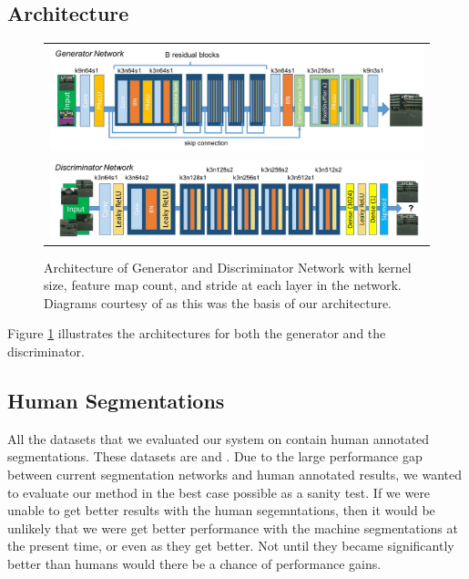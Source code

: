 \documentclass[10pt,twocolumn,letterpaper]{article}
\begin{document}
\subsection{Architecture}
\begin{figure}[ht!]
\begin{center}
    \begin{tabular}{c}
	\includegraphics[width=6.5in]{images/generator_architecture.png}\\
	\includegraphics[width=6.5in]{images/discriminator_architecture.png}
    \end{tabular}
\end{center}
    \caption{Architecture of Generator and Discriminator Network with kernel
    size, feature map count, and stride at each layer in the network. Diagrams
    courtesy of \cite{SRGAN} as this was the basis of our architecture.}
    \label{fig:generator}
\end{figure}

Figure \ref{fig:generator} illustrates the architectures for both the generator
and the discriminator.

\subsection{Human Segmentations}
All the datasets that we evaluated our system on contain human annotated
segmentations. These datasets are \cite{Cityscapes} and \cite{MSCOCO}. Due to
the large performance gap between current segmentation networks and human
annotated results, we wanted to evaluate our method in the best case possible
as a sanity test. If we were unable to get better results with the human
segemntations, then it would be unlikely that we were get better performance
with the machine segmentations at the present time, or even as they get better.
Not until they became significantly better than humans would there be a chance
of performance gains.
\end{document}
